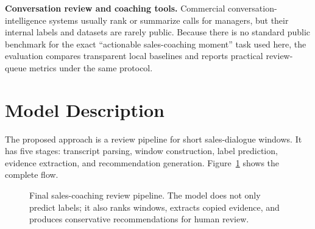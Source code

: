 \documentclass{article}
\begin{document}
\textbf{Conversation review and coaching tools.} Commercial conversation-intelligence systems usually rank or summarize calls for managers, but their internal labels and datasets are rarely public. Because there is no standard public benchmark for the exact ``actionable sales-coaching moment'' task used here, the evaluation compares transparent local baselines and reports practical review-queue metrics under the same protocol.

\section{Model Description}
\label{sec:model}
The proposed approach is a review pipeline for short sales-dialogue windows. It has five stages: transcript parsing, window construction, label prediction, evidence extraction, and recommendation generation. Figure~\ref{fig:pipeline} shows the complete flow.

\begin{figure}[!tbh]
    \centering
    \caption{Final sales-coaching review pipeline. The model does not only predict labels; it also ranks windows, extracts copied evidence, and produces conservative recommendations for human review.}
    \label{fig:pipeline}
\end{figure}
\end{document}
